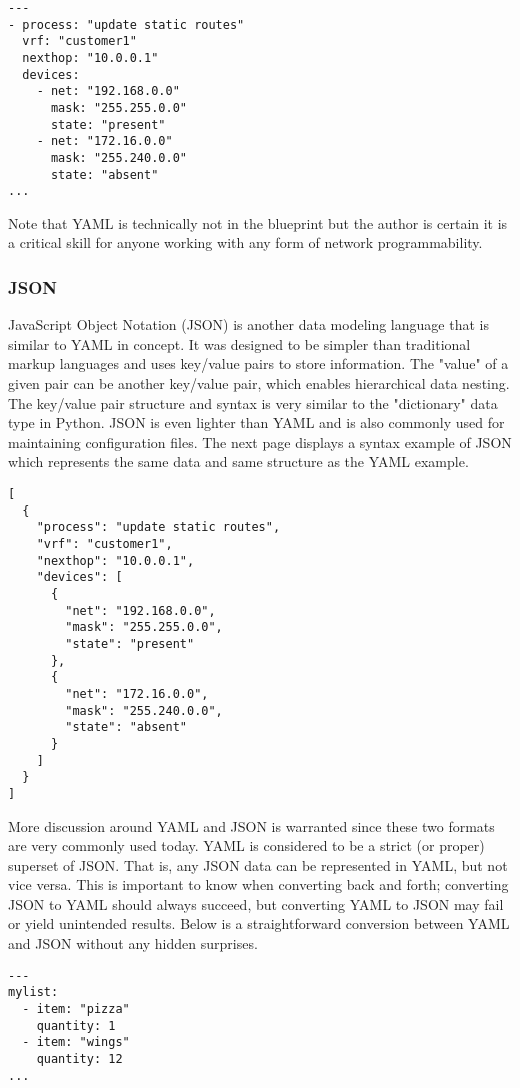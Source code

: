 \begin{verbatim}
---
- process: "update static routes"
  vrf: "customer1"
  nexthop: "10.0.0.1"
  devices:
    - net: "192.168.0.0"
      mask: "255.255.0.0"
      state: "present"
    - net: "172.16.0.0"
      mask: "255.240.0.0"
      state: "absent"
...
\end{verbatim}

Note that YAML is technically not in the blueprint but the author is certain
it is a critical skill for anyone working with any form of network programmability.

\subsubsection{JSON}
JavaScript Object Notation (JSON) is another data modeling language that is
similar to YAML in concept. It was designed to be simpler than traditional
markup languages and uses key/value pairs to store information. The "value" of
a given pair can be another key/value pair, which enables hierarchical data
nesting. The key/value pair structure and syntax is very similar to the
"dictionary" data type in Python. JSON is even lighter than YAML and is also
commonly used for maintaining configuration files. The next page displays a
syntax example of JSON which represents the same data and same structure as
the YAML example.

\begin{verbatim}
[
  {
    "process": "update static routes",
    "vrf": "customer1",
    "nexthop": "10.0.0.1",
    "devices": [
      {
        "net": "192.168.0.0",
        "mask": "255.255.0.0",
        "state": "present"
      },
      {
        "net": "172.16.0.0",
        "mask": "255.240.0.0",
        "state": "absent"
      }
    ]
  }
]
\end{verbatim}

More discussion around YAML and JSON is warranted since these two formats are
very commonly used today. YAML is considered to be a strict (or proper)
superset of JSON. That is, any JSON data can be represented in YAML, but not
vice versa. This is important to know when converting back and forth;
converting JSON to YAML should always succeed, but converting YAML to JSON may
fail or yield unintended results. Below is a straightforward conversion
between YAML and JSON without any hidden surprises.

\begin{verbatim}
---
mylist:
  - item: "pizza"
    quantity: 1
  - item: "wings"
    quantity: 12
...
\end{verbatim}

